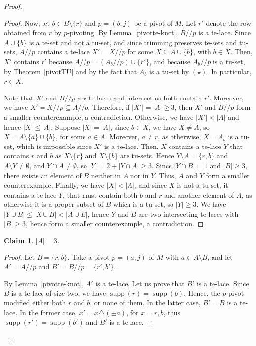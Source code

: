 \documentclass[11pt,a4paper]{amsart}
\renewcommand*{\geq}{\geqslant}
\renewcommand*{\leq}{\leqslant}
\theoremstyle{plain}
\newtheorem{claimnumb}{Claim}[theorem]{\itshape}{\rmfamily}
\theoremstyle{definition}
\DeclareMathOperator{\supp}{supp}
\begin{document}
\begin{proof}
\begin{proof}
Now, let $b\in B\setminus\{r\}$ and $p=(b,j)$ be a pivot of $M$. 
Let $r'$ denote the row obtained from $r$ by $p$-pivoting.
By Lemma~\ref{pivotte-knot}, $B/\!\!/p$ is a te-lace.
Since $A\cup\{b\}$ is a te-set and not a tu-set, and since trimming preserves te-sets and tu-sets, $A/\!\!/p$ contains a te-lace $X'=X/\!\!/p$ for some $X\subseteq A\cup\{b\}$, with $b\in X$.
Then, $X'$ contains $r'$ because $A/\!\!/p=(A_b/\!\!/p)\cup\{r'\}$, and because $A_b/\!\!/p$ is a tu-set, by Theorem~\ref{pivotTU} and by the fact that $A_b$ is a tu-set by $(\star)$.
In particular, $r\in X$.


Note that $X'$ and $B/\!\!/p$ are te-laces and intersect as both contain $r'$.
Moreover, we have $X'=X/\!\!/p\subseteq A/\!\!/p$.
Therefore, if $|X'|=|A|\geq 3$, then $X'$ and $B/\!\!/p$ form a smaller counterexample, a contradiction.
Otherwise, we have $|X'|<|A|$ and hence $|X|\leq|A|$.
Suppose $|X|=|A|$, since $b\in X$, we have $X\neq A$, so $X=A\setminus\{a\}\cup\{b\}$, for some $a\in A$. Moreover, $a\neq r$, as otherwise, $X=A_b$ is a tu-set, which is impossible since $X'$ is a te-lace.
Then, $X$ contains a te-lace $Y$ that contains $r$ and $b$ as $X\setminus\{r\}$ and $X\setminus\{b\}$ are tu-sets.
Hence $Y\setminus A = \{r,b\}$ and $A\setminus Y \neq \emptyset$, and $Y\cap A \neq \emptyset$, so $|Y| = 2+|Y\cap A|\geq 3$.
Since $|Y\cap B|=1$ and $|B|\geq 3$, there exists an element of $B$ neither in $A$ nor in $Y$. Thus, $A$ and $Y$ form a smaller counterexample.
Finally, we have $|X|<|A|$, and since $X$ is not a tu-set, it contains a te-lace $Y$, that must contain both $b$ and $r$ and another element of $A$, as otherwise it is a proper subset of $B$ which is a tu-set, so $|Y|\geq 3$.
We have $|Y\cup B|\leq |X\cup B|< |A\cup B|$, hence $Y$ and $B$ are two intersecting te-laces with $|B|\geq 3$, hence form a smaller counterexample, a contradiction.
\end{proof}

\begin{claimnumb}\label{cl3}
$|A|=3$.
\end{claimnumb}
\begin{proof}
Let $B=\{r,b\}$.
Take a pivot $p=(a,j)$ of $M$ with $a\in A\setminus B$, and let $A'=A/\!\!/p$ and $B'=B/\!\!/p=\{r',b'\}$. 

By Lemma~\ref{pivotte-knot}, $A'$ is a te-lace.
Let us prove that $B'$ is a te-lace.
Since $B$ is a te-lace of size two, we have $\supp(r)=\supp(b)$.
Hence, the $p$-pivot modified either both $r$ and $b$, or none of them. 
In the latter case, $B'=B$ is a te-lace.
In the former case, $x'=x\triangle (\pm a)$, for $x=r,b$, thus $\supp(r')=\supp(b')$ and $B'$ is a te-lace.


\end{proof}
\end{proof}
\end{document}
